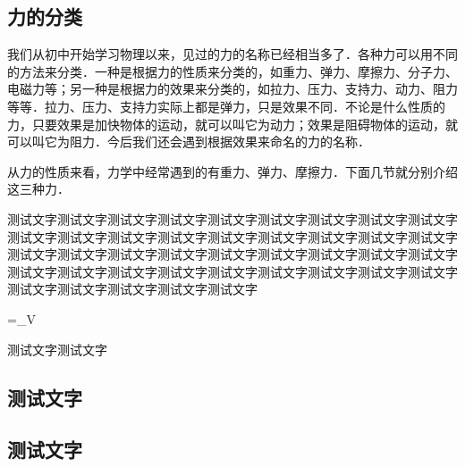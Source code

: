\begin{Project}
\subsection{力的分类}

我们从初中开始学习物理以来，见过的力的名称已经相当多了．各种力可以用不同的方法来分类．一种是根据力的性质来分类的，如重力、弹力、摩擦力、分子力、电磁力等；另一种是根据力的效果来分类的，如拉力、压力、支持力、动力、阻力等等．拉力、压力、支持力实际上都是弹力，只是效果不同．不论是什么性质的力，只要效果是加快物体的运动，就可以叫它为动力；效果是阻碍物体的运动，就可以叫它为阻力．今后我们还会遇到根据效果来命名的力的名称．

从力的性质来看，力学中经常遇到的有重力、弹力、摩擦力．下面几节就分别介绍这三种力．


\begin{Example}
	测试文字测试文字测试文字测试文字测试文字测试文字测试文字测试文字测试文字测试文字测试文字测试文字测试文字测试文字测试文字测试文字测试文字测试文字测试文字测试文字测试文字测试文字测试文字测试文字测试文字测试文字测试文字测试文字测试文字测试文字测试文字测试文字测试文字测试文字测试文字测试文字测试文字测试文字测试文字测试文字测试文字
	\begin{flalign}
		\Psi=\int_\Omega{}V
	\end{flalign}
\end{Example}

\begin{Example}
	测试文字测试文字
\end{Example}


\subsection{测试文字}
\subsection*{测试文字}
\zhlipsum[1]

\clearpage


\end{Project}
